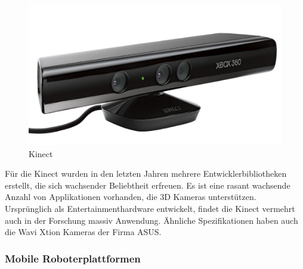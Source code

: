 
\begin{figure}[h]
\center
\includegraphics[scale=0.3]{graphics/Kinect.jpg}
\caption{\label{fig:Kinect} Kinect \cite{kinect_1}}
\end{figure}

Für die Kinect wurden in den letzten Jahren mehrere Entwicklerbibliotheken erstellt, die sich wachsender Beliebtheit erfreuen.
Es ist eine rasant wachsende Anzahl von Applikationen vorhanden, die 3D Kameras unterstützen.
Ursprünglich als Entertainmenthardware entwickelt, findet die Kinect vermehrt auch in der Forschung massiv Anwendung.
Ähnliche Spezifikationen haben auch die Wavi Xtion Kameras der Firma ASUS.



\subsubsection{Mobile Roboterplattformen}

